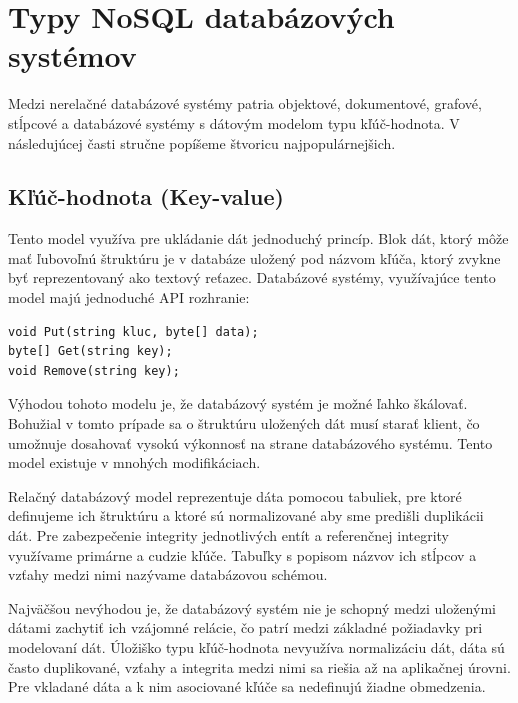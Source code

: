 \documentclass[11pt,twoside,a4paper]{book}
\begin{document}

\section{Typy NoSQL databázových systémov}

Medzi nerelačné databázové systémy patria objektové, dokumentové, grafové, stĺpcové a databázové systémy s dátovým modelom typu kľúč-hodnota. V následujúcej časti stručne popíšeme štvoricu najpopulárnejšich.

\subsection{Kľúč-hodnota (Key-value)}
Tento model využíva pre ukládanie dát jednoduchý princíp. Blok dát, ktorý môže mať ľubovoľnú štruktúru je v databáze uložený pod názvom kľúča, ktorý zvykne byť reprezentovaný ako textový reťazec. Databázové systémy, využívajúce tento model majú jednoduché API rozhranie:

\begin{verbatim}
void Put(string kluc, byte[] data);
byte[] Get(string key);
void Remove(string key);
\end{verbatim}

Výhodou tohoto modelu je, že databázový systém je možné ľahko škálovať. Bohužial v tomto prípade sa o štruktúru uložených dát musí starať klient, čo umožnuje dosahovať vysokú výkonnosť na strane databázového systému. Tento model existuje v mnohých modifikáciach.

Relačný databázový model reprezentuje dáta pomocou tabuliek, pre ktoré definujeme ich štruktúru a ktoré sú normalizované aby sme predišli duplikácii dát. Pre zabezpečenie integrity jednotlivých entít a referenčnej integrity využívame primárne a cudzie kľúče. Tabuľky s popisom názvov ich stĺpcov a vzťahy medzi nimi nazývame databázovou schémou. 

Najväčšou nevýhodou je, že databázový systém nie je schopný medzi uloženými dátami zachytiť ich vzájomné relácie, čo patrí medzi základné požiadavky pri modelovaní dát. Úložiško typu kľúč-hodnota nevyužíva normalizáciu dát, dáta sú často duplikované, vzťahy a integrita medzi nimi sa riešia až na aplikačnej úrovni. Pre vkladané dáta a k nim asociované kľúče sa nedefinujú žiadne obmedzenia.
\end{document}
